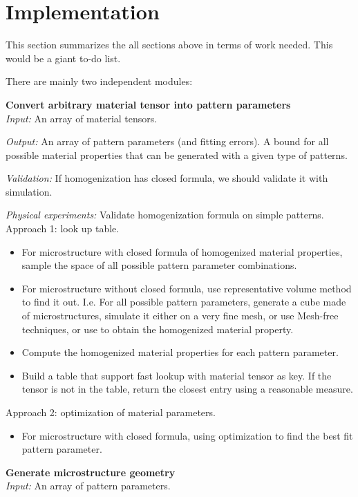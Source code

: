 \section{Implementation}
This section summarizes the all sections above in terms of work needed.  This
would be a giant to-do list.

There are mainly two independent modules:
\begin{description}
\item{\bf Convert arbitrary material tensor into pattern parameters}\\
{\it Input:} An array of material tensors.

{\it Output:} An array of pattern parameters (and fitting errors).  A bound for
all possible material properties that can be generated with a given type of patterns.

{\it Validation:} If homogenization has closed formula, we should validate it
with simulation.

{\it Physical experiments:}  Validate homogenization formula on simple patterns.\\

Approach 1: look up table.
\begin{itemize}
\item For microstructure with closed formula of homogenized material properties,
sample the space of all possible pattern parameter combinations.
\item For microstructure without closed formula, use representative volume
method to find it out.  I.e. For all possible pattern parameters, generate a
cube made of microstructures, simulate it either on a very fine mesh, or use
Mesh-free techniques, or use \cite{Kharevych2009} to obtain the homogenized
material property.
\item Compute the homogenized material properties for each pattern parameter.
\item Build a table that support fast lookup with material tensor as key.  If
the tensor is not in the table, return the closest entry using a reasonable
measure.
\end{itemize}

Approach 2: optimization of material parameters.
\begin{itemize}
\item For microstructure with closed formula, using optimization to find the
best fit pattern parameter.
\end{itemize}

\item{\bf Generate microstructure geometry}\\
{\it Input:} An array of pattern parameters.


\end{description}

